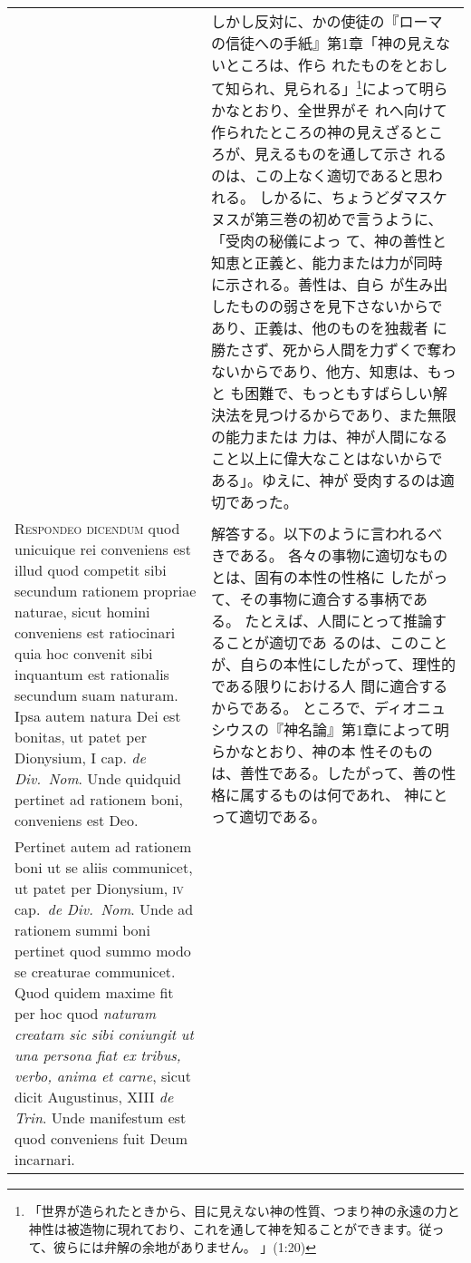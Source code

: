\documentclass[10pt]{jsarticle} %
\begin{document}
\begin{longtable}{p{21em}p{21em}}
&
しかし反対に、かの使徒の『ローマの信徒への手紙』第1章「神の見えないところは、作ら
 れたものをとおして知られ、見られる」\footnote{「世界が造られたときから、目に見えない神の性質、つまり神の永遠の力と神性は被造物に現れており、これを通して神を知ることができます。従って、彼らには弁解の余地がありません。 」(1:20)}によって明らかなとおり、全世界がそ
 れへ向けて作られたところの神の見えざるところが、見えるものを通して示さ
 れるのは、この上なく適切であると思われる。
しかるに、ちょうどダマスケヌスが第三巻の初めで言うように、「受肉の秘儀によっ
 て、神の善性と知恵と正義と、能力または力が同時に示される。善性は、自ら
 が生み出したものの弱さを見下さないからであり、正義は、他のものを独裁者
に勝たさず、死から人間を力ずくで奪わないからであり、他方、知恵は、もっと
 も困難で、もっともすばらしい解決法を見つけるからであり、また無限の能力または
 力は、神が人間になること以上に偉大なことはないからである」。ゆえに、神が
 受肉するのは適切であった。

\\

{\scshape Respondeo dicendum} quod unicuique rei conveniens est illud quod competit
sibi secundum rationem propriae naturae, sicut homini conveniens est
ratiocinari quia hoc convenit sibi inquantum est rationalis secundum
suam naturam. Ipsa autem natura Dei est bonitas, ut patet per Dionysium,
I cap. {\itshape de Div.~Nom}. Unde quidquid pertinet ad rationem boni, conveniens
est Deo. 


&

解答する。以下のように言われるべきである。
各々の事物に適切なものとは、固有の本性の性格に
 したがって、その事物に適合する事柄である。
たとえば、人間にとって推論することが適切であ
 るのは、このことが、自らの本性にしたがって、理性的である限りにおける人
 間に適合するからである。
ところで、ディオニュシウスの『神名論』第1章によって明らかなとおり、神の本
 性そのものは、善性である。したがって、善の性格に属するものは何であれ、
 神にとって適切である。

\\


Pertinet autem ad rationem boni ut se aliis communicet, ut
patet per Dionysium, {\scshape iv} cap.~{\itshape de Div.~Nom}. Unde ad rationem summi boni
pertinet quod summo modo se creaturae communicet. Quod quidem maxime fit
per hoc quod {\itshape naturam creatam sic sibi coniungit ut una persona fiat ex
tribus, verbo, anima et carne}, sicut dicit Augustinus, XIII {\itshape de
Trin}. Unde manifestum est quod conveniens fuit Deum incarnari.

&



\end{longtable}
\end{document}
